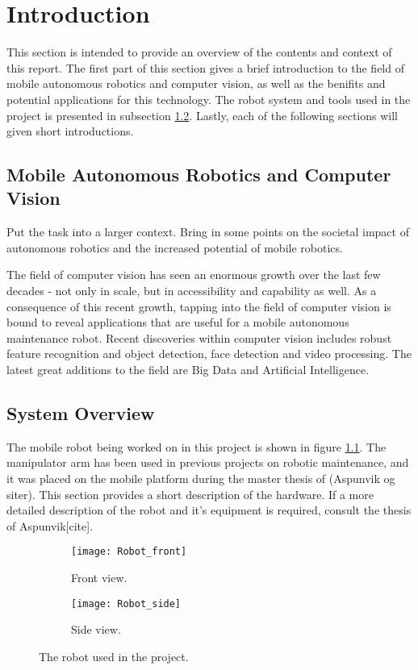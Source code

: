 \chapter{Introduction}
\label{chp:introduction} 

This section is intended to provide an overview of the contents and context of this report. The first part of this section gives a brief introduction to the field of mobile autonomous robotics and computer vision, as well as the benifits and potential applications for this technology. The robot system and tools used in the project is presented in subsection \ref{}. Lastly, each of the following sections will given short introductions.




\section{Mobile Autonomous Robotics and Computer Vision}

Put the task into a larger context. Bring in some points on the societal impact of autonomous robotics and the increased potential of mobile robotics.  

The field of computer vision has seen an enormous growth over the last few decades - not only in scale, but in accessibility and capability as well. As a consequence of this recent growth, tapping into the field of computer vision is bound to reveal applications that are useful for a mobile autonomous maintenance robot. Recent discoveries within computer vision includes robust feature recognition and object detection, face detection and video processing. The latest great additions to the field are Big Data and Artificial Intelligence.

\section{System Overview}

The mobile robot being worked on in this project is shown in figure \ref{fig:RobotFront}. The manipulator arm  has been used in previous projects on robotic maintenance, and it was placed on the mobile platform during the master thesis of (Aspunvik og siter). This section provides a short description of the hardware. If a more detailed description of the robot and it's equipment is required, consult the thesis of Aspunvik[cite]. 

\begin{figure}
\centering
 \begin{subfigure}[b]{0.3\textwidth}
        \texttt{[image: Robot\_front]}
        \caption{Front view.}
        \label{fig:RobotFront}
    \end{subfigure}
    \begin{subfigure}[b]{0.65\textwidth}
        \texttt{[image: Robot\_side]}
        \caption{Side view.}
        \label{fig:RobotSide}
    \end{subfigure}
    \caption{\label{fig:RobotView}The robot used in the project.}
\end{figure}

